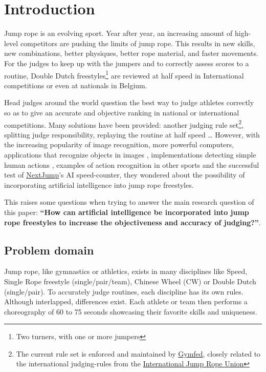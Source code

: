 
\section{Introduction}
\label{sec:introduction}

Jump rope is an evolving sport.
Year after year, an increasing amount of high-level competitors are pushing the limits of jump rope.
This results in new skills, new combinations, better physiques, better rope material, and faster movements. For the judges to keep up with the jumpers and to correctly assess scores to a routine, Double Dutch freestyles\footnote{Two turners, with one or more jumpers} are reviewed at half speed in International competitions or even at nationals in Belgium.

Head judges around the world question the best way to judge athletes correctly so as to give an accurate and objective ranking in national or international competitions.
Many solutions have been provided: another judging rule set\footnote{The current rule set is enforced and maintained by \href{https://www.gymfed.be/}{Gymfed}, closely related to the international judging-rules from the \href{https://ijru.sport/}{International Jump Rope Union}}, splitting judge responsibility, replaying the routine at half speed \dots
However, with the increasing popularity of image recognition, more powerful computers, applications that recognize objects in images \autocite{Singh_Gill_2022}, implementations detecting simple human actions \autocite{LUQMAN_2022}, examples of action recognition in other sports \autocite{Yin_2024} and the successful test of \href{https://nextjump.app/}{NextJump}'s AI speed-counter, they wondered about the possibility of incorporating artificial intelligence into jump rope freestyles.

This raises some questions when trying to answer the main research question of this paper: \textbf{``How can artificial intelligence be incorporated into jump rope freestyles to increase the objectiveness and accuracy of judging?''}.

\subsection{Problem domain}
\label{subsec:intro-problem-domain}

Jump rope, like gymnastics or athletics, exists in many disciplines like Speed, Single Rope freestyle (single/pair/team), Chinese Wheel (CW) or Double Dutch (single/pair).
To accurately judge routines, each discipline has its own rules. Although interlapped, differences exist. Each athlete or team then performs a choreography of 60 to 75 seconds showcasing their favorite skills and uniqueness.

